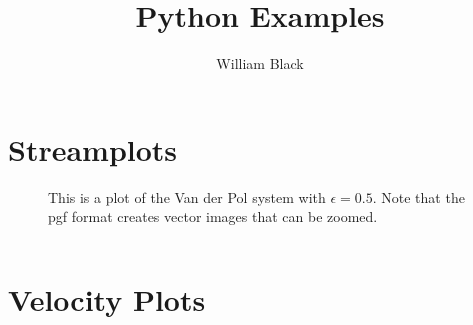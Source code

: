 \documentclass[letterpaper, 10pt, reqno]{amsart}
\title{Python Examples}
\author{William Black}
\date{}
\begin{document}
\maketitle

\section{Streamplots}
\begin{figure}[h]
  \begin{center}
    
    \caption{This is a plot of the Van der Pol system with \(\epsilon = 0.5\). Note that the pgf format creates vector images that can be zoomed.}
  \end{center}
\end{figure}
\newpage
\inputminted[linenos=true,frame=single]{python}{streamplot.py}

\newpage
\section{Velocity Plots}

\begin{figure}[h]
  \begin{center}
    
  \end{center}
\end{figure}
\newpage
\inputminted[linenos=true,frame=single]{python}{velocityplot.py}
\end{document}
